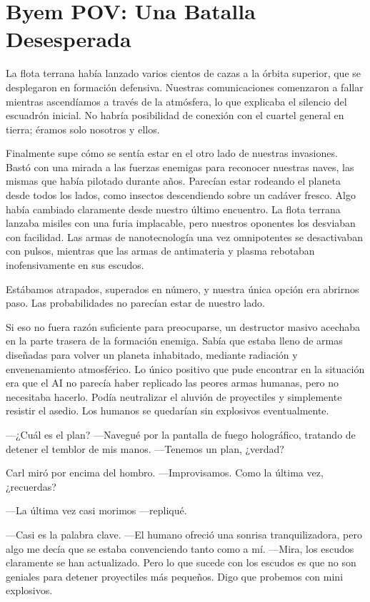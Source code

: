 \documentclass[spanish,12pt,a4paper,oneside,titlepage]{book}
\begin{document}
    \chapter{Byem POV: Una Batalla Desesperada}\label{sec:byem-pov-una-batalla-desesperada}

    La flota terrana había lanzado varios cientos de cazas a la órbita superior, que se desplegaron en formación defensiva. Nuestras comunicaciones comenzaron a fallar mientras ascendíamos a través de la atmósfera, lo que explicaba el silencio del escuadrón inicial. No habría posibilidad de conexión con el cuartel general en tierra; éramos solo nosotros y ellos.

    Finalmente supe cómo se sentía estar en el otro lado de nuestras invasiones. Bastó con una mirada a las fuerzas enemigas para reconocer nuestras naves, las mismas que había pilotado durante años. Parecían estar rodeando el planeta desde todos los lados, como insectos descendiendo sobre un cadáver fresco. Algo había cambiado claramente desde nuestro último encuentro. La flota terrana lanzaba misiles con una furia implacable, pero nuestros oponentes los desviaban con facilidad. Las armas de nanotecnología una vez omnipotentes se desactivaban con pulsos, mientras que las armas de antimateria y plasma rebotaban inofensivamente en sus escudos.

    Estábamos atrapados, superados en número, y nuestra única opción era abrirnos paso. Las probabilidades no parecían estar de nuestro lado.

    Si eso no fuera razón suficiente para preocuparse, un destructor masivo acechaba en la parte trasera de la formación enemiga. Sabía que estaba lleno de armas diseñadas para volver un planeta inhabitado, mediante radiación y envenenamiento atmosférico. Lo único positivo que pude encontrar en la situación era que el AI no parecía haber replicado las peores armas humanas, pero no necesitaba hacerlo. Podía neutralizar el aluvión de proyectiles y simplemente resistir el asedio. Los humanos se quedarían sin explosivos eventualmente.

    —¿Cuál es el plan? —Navegué por la pantalla de fuego holográfico, tratando de detener el temblor de mis manos. —Tenemos un plan, ¿verdad?

    Carl miró por encima del hombro. —Improvisamos. Como la última vez, ¿recuerdas?

    —La última vez casi morimos —repliqué.

    —Casi es la palabra clave. —El humano ofreció una sonrisa tranquilizadora, pero algo me decía que se estaba convenciendo tanto como a mí. —Mira, los escudos claramente se han actualizado. Pero lo que sucede con los escudos es que no son geniales para detener proyectiles más pequeños. Digo que probemos con mini explosivos.
\end{document}
